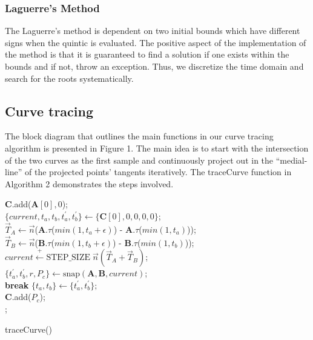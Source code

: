 \documentclass[journal, letterpaper]{IEEEtran}
\begin{document}
\subsubsection{Laguerre's Method}
The Laguerre's method is dependent on two initial bounds which have different signs when the 
quintic is evaluated. The positive aspect of the implementation of the method is that it is guaranteed to find a solution
if one exists within the bounds and if not, throw an exception. Thus, we discretize the
time domain and search for the roots systematically. 

\subsection{Curve tracing}

The block diagram that outlines the main functions in our curve tracing algorithm is presented in Figure 1.
The main idea is to start with the intersection of the two curves as the first sample and continuously project
out in the ``medial-line'' of the projected points' tangents iteratively. The traceCurve function in Algorithm 2
demonstrates the steps involved. 

\begin{algorithm}[ht!]
  $\mathbf{C}.$add($\mathbf{A}[0], 0$); \\
  $\{current, t_a, t_b, t_a^\prime, t_b^\prime\} \leftarrow \{\mathbf{C}[0],0,0,0,0\}$; \\
   {
  $\vec{T}_A \leftarrow \vec{n}$($\mathbf{A}.\tau$($min(1,t_a+\epsilon)$) - $\mathbf{A}.\tau$($min(1,t_a)$)); \\
  $\vec{T}_B \leftarrow \vec{n}$($\mathbf{B}.\tau$($min(1,t_b+\epsilon)$) - $\mathbf{B}.\tau$($min(1,t_b)$)); \\
  $current \stackrel{+}\leftarrow \text{STEP\_SIZE} \;\vec{n}(\vec{T}_A + \vec{T}_B)$; \\
  $\{t_a^\prime, t_b^\prime, r, P_c\} \leftarrow \text{snap}(\mathbf{A},\mathbf{B},current)$; \\
   {
		\textbf{  break}
	}
  $\{t_a, t_b\} \leftarrow \{t_a^\prime, t_b^\prime\};$ \\
  $\mathbf{C}.$add($P_c$); \\
  }
  ;
  \caption{traceCurve()}
\end{algorithm}
\end{document}
